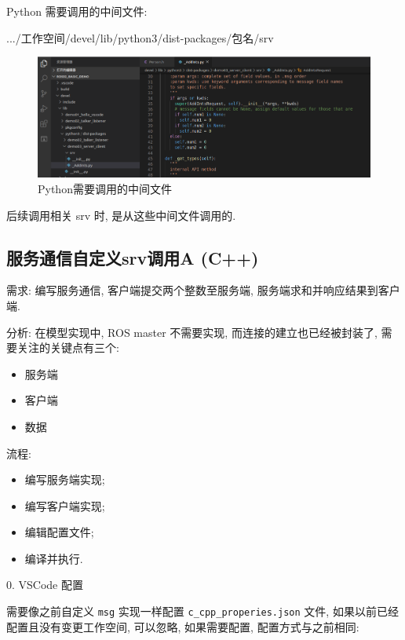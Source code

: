 \documentclass[openany, fontset=windowsold]{ctexbook}
\theoremstyle{kaiti}
\theoremstyle{normal}
\begin{document}
Python 需要调用的中间文件:

\begin{bash}
  .../工作空间/devel/lib/python3/dist-packages/包名/srv
\end{bash}

\begin{figure}[!ht]
  \centering
  \includegraphics[width=.9\textwidth]{customized_srv_vscode_python.png}
  \caption{Python需要调用的中间文件}
  \label{fig:cusomized_srv_vscode_python}
\end{figure}

后续调用相关 srv 时, 是从这些中间文件调用的.

\subsection{服务通信自定义srv调用A (C++)}

需求: 编写服务通信, 客户端提交两个整数至服务端, 服务端求和并响应结果到客户端.

分析: 在模型实现中, ROS master 不需要实现, 而连接的建立也已经被封装了, 需要关注的关键点有三个:

\begin{itemize}
  \item 服务端
  \item 客户端
  \item 数据
\end{itemize}

流程:

\begin{itemize}
  \item 编写服务端实现; 
  \item 编写客户端实现; 
  \item 编辑配置文件; 
  \item 编译并执行.
\end{itemize}

0. VSCode 配置

需要像之前自定义 \verb|msg| 实现一样配置 \verb|c_cpp_properies.json| 文件, 如果以前已经配置且没有变更工作空间, 可以忽略, 如果需要配置, 配置方式与之前相同:
\end{document}
